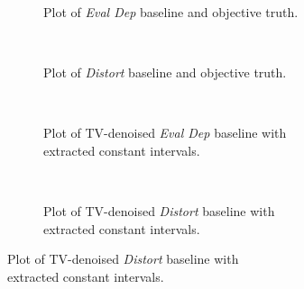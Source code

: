 \documentclass[preview]{standalone}
\begin{document}
\begin{minipage}{19.05cm}
    \begin{figure}
        \centering
    	\begin{subfigure}[t]{7.5cm}
        
     	\vspace{-0.5em}
     	\caption{Plot of \textit{Eval Dep} baseline and objective truth.}
    	\label{Fig:4a}
    	\end{subfigure}
    	~
    	\begin{subfigure}[t]{10.1cm}
        
    	\vspace{-1.7em}
    	\caption{Plot of \textit{Distort} baseline and objective truth.}
    	\label{Fig:4b}
    	\end{subfigure}
    	\\
    	\begin{subfigure}[t]{7.5cm}
        
     	\vspace{-0.5em}
     	\caption{Plot of TV-denoised \textit{Eval Dep} baseline with\\extracted constant intervals.}
    	\label{Fig:4c}
    	\end{subfigure}
    	~
    	\begin{subfigure}[t]{10.1cm}
        
    	\vspace{-1.7em}
    	\caption{Plot of TV-denoised \textit{Distort} baseline with\\extracted constant intervals.}
    	\label{Fig:4d}
    	\end{subfigure}
    	
    \end{figure}
\end{minipage}
\end{document}
